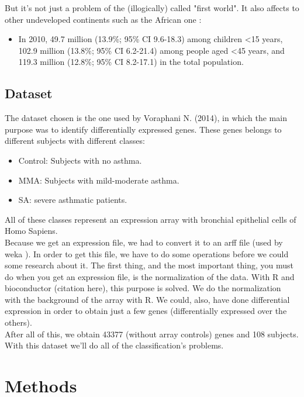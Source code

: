\documentclass[conference,a4paper]{IEEEtran}
\begin{document}
But it's not just a problem of the (illogically) called "first world". It also affects to other undeveloped continents such as the African one \cite{asthmaAfrica}:

\begin{itemize}
	\item In 2010, 49.7 million (13.9\%; 95\% CI 9.6-18.3) among children <15 years, 102.9 million (13.8\%; 95\% CI 6.2-21.4) among people aged <45 years, and 119.3 million (12.8\%; 95\% CI 8.2-17.1) in the total population.
\end{itemize}


\subsection{Dataset}

The dataset chosen is the one used by Voraphani N. (2014)\cite{voraphani2014}, in which the main purpose was to identify differentially expressed genes. These genes belongs to different subjects with different classes:

\begin{itemize}
	\item Control: Subjects with no asthma.
	
	\item MMA: Subjects with mild-moderate asthma.
	
	\item SA: severe asthmatic patients.
\end{itemize}

All of these classes represent an expression array with bronchial epithelial cells of Homo Sapiens.
\\
Because we get an expression file, we had to convert it to an arff file (used by weka \cite{weka}). In order to get this file, we have to do some operations before we could some research about it. The first thing, and the most important thing, you must do when you get an expression file, is the normalization of the data. With R and bioconductor \cite{bionductor} (citation here), this purpose is solved. We do the normalization with the background of the array with R.
We could, also, have done differential expression in order to obtain just a few genes (differentially expressed over the others).
\\
After all of this, we obtain 43377 (without array controls) genes and 108 subjects. With this dataset we'll do all of the classification's problems.

\section{Methods}
\end{document}
